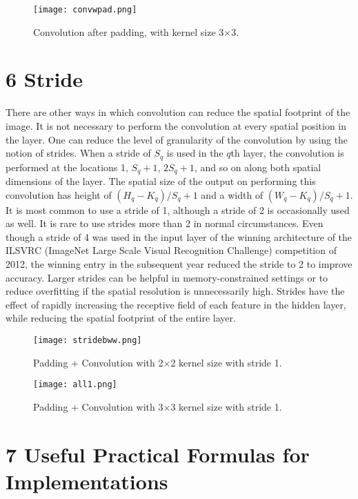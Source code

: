 \documentclass[11pt]{article}
\begin{document}
\begin{figure}[H]
\centering
\texttt{[image: convwpad.png]}
\caption{Convolution after padding, with kernel size 3$\times$3.}
\label{fig:figure3}
\end{figure}

\section{6 Stride}
\hspace*{1cm} There are other ways in which convolution can reduce the spatial footprint of the image. It is not necessary to perform the convolution at every spatial position in the layer. One can reduce the level of granularity of the convolution by using the notion of strides. When a stride of $S_q$ is used in the $q$th layer, the convolution is performed at the locations 1, $S_q+1$, $2S_q+1$, and so on along both spatial dimensions of the layer. The spatial size of the output on performing this convolution has height of $(H_q - K_q)/S_q + 1$ and a width of $(W_q - K_q)/S_q + 1$. \\
It is most common to use a stride of 1, although a stride of 2 is occasionally used as well. It is rare to use strides more than 2 in normal circumstances. Even though a stride of 4 was used in the input layer of the winning architecture of the ILSVRC (ImageNet Large Scale Visual Recognition Challenge) competition of 2012, the winning entry in the subsequent year reduced the stride to 2 to improve accuracy. Larger strides can be helpful in memory-constrained settings or to reduce overfitting if the spatial resolution is unnecessarily high. Strides have the effect of rapidly increasing the receptive field of each feature in the hidden layer, while reducing the spatial footprint of the entire layer.
\begin{figure}[H]
\centering
\texttt{[image: stridebww.png]}
\caption{Padding + Convolution with 2$\times$2 kernel size with stride 1.}
\label{fig:figure3}
\end{figure}
\begin{figure}[H]
\centering
\texttt{[image: all1.png]}
\caption{Padding + Convolution with 3$\times$3 kernel size with stride 1.}
\label{fig:figure3}
\end{figure}
\section*{7 Useful Practical Formulas for Implementations}
\end{document}
